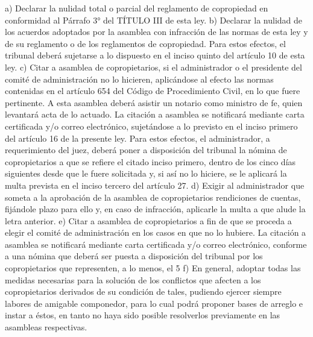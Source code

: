     a) Declarar la nulidad total o parcial del reglamento de copropiedad en conformidad al Párrafo 3° del TÍTULO III de esta ley.
    b) Declarar la nulidad de los acuerdos adoptados por la asamblea con infracción de las normas de esta ley y de su reglamento o de los reglamentos de copropiedad. Para estos efectos, el tribunal deberá sujetarse a lo dispuesto en el inciso quinto del artículo 10 de esta ley.
    c) Citar a asamblea de copropietarios, si el administrador o el presidente del comité de administración no lo hicieren, aplicándose al efecto las normas contenidas en el artículo 654 del Código de Procedimiento Civil, en lo que fuere pertinente. A esta asamblea deberá asistir un notario como ministro de fe, quien levantará acta de lo actuado. La citación a asamblea se notificará mediante carta certificada y/o correo electrónico, sujetándose a lo previsto en el inciso primero del artículo 16 de la presente ley. Para estos efectos, el administrador, a requerimiento del juez, deberá poner a disposición del tribunal la nómina de copropietarios a que se refiere el citado inciso primero, dentro de los cinco días siguientes desde que le fuere solicitada y, si así no lo hiciere, se le aplicará la multa prevista en el inciso tercero del artículo 27.
    d) Exigir al administrador que someta a la aprobación de la asamblea de copropietarios rendiciones de cuentas, fijándole plazo para ello y, en caso de infracción, aplicarle la multa a que alude la letra anterior.
    e) Citar a asamblea de copropietarios a fin de que se proceda a elegir el comité de administración en los casos en que no lo hubiere. La citación a asamblea se notificará mediante carta certificada y/o correo electrónico, conforme a una nómina que deberá ser puesta a disposición del tribunal por los copropietarios que representen, a lo menos, el 5%
    f) En general, adoptar todas las medidas necesarias para la solución de los conflictos que afecten a los copropietarios derivados de su condición de tales, pudiendo ejercer siempre labores de amigable componedor, para lo cual podrá proponer bases de arreglo e instar a éstos, en tanto no haya sido posible resolverlos previamente en las asambleas respectivas.
     
